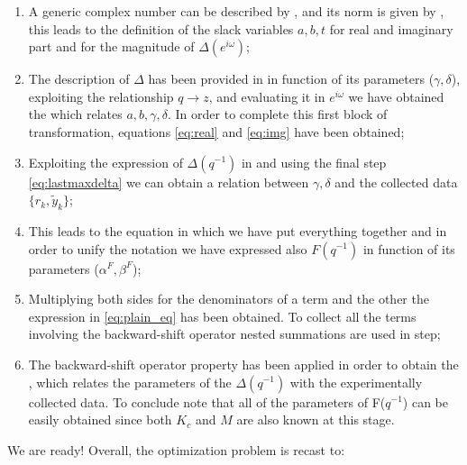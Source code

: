 \begin{enumerate}
    \item A generic complex number can be described by , and its norm  is given by , this leads to the definition of the slack variables $a,b,t$ for real and imaginary part and for the magnitude of $\Delta(e^{i\omega})$;
    \item The description of $\Delta$ has been provided in  in function of its parameters ($\gamma,\delta$), exploiting the relationship $q\to{z}$, and evaluating it in $e^{i\omega}$ we have obtained the  which relates $a,b,\gamma,\delta$. In order to complete this first block of transformation, equations \cref{eq:real} and \cref{eq:img} have been obtained; 
    \item Exploiting the expression of $\Delta(q^{-1})$ in  and using the final step \cref{eq:lastmaxdelta} we can obtain a relation between $\gamma,\delta$ and the collected data $\{r_k,\tilde{y}_k\}$; 
    \item This leads to the equation  in which we have put everything together and in order to unify the notation we have expressed also $F(q^{-1})$ in function of its parameters ($\alpha^F, \beta^F$); 
    \item Multiplying both sides for the denominators of a term and the other the expression in \cref{eq:plain_eq} has been obtained. To collect all the terms involving the backward-shift operator nested summations are used in  step; 
    \item The backward-shift operator property has been applied in order to obtain the , which relates the parameters of the $\Delta(q^{-1})$ with the experimentally collected data. To conclude note that all of the parameters of F($q^{-1}$) can be easily obtained since both $K_c$ and $M$ are also known at this stage.
 \end{enumerate}

We are ready! Overall, the optimization problem is recast to:


